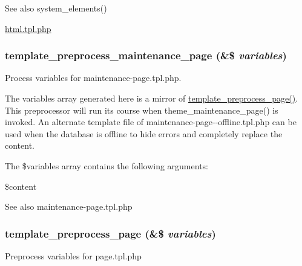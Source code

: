 \begin{DoxySeeAlso}{See also}
system\_\-elements() 

\hyperlink{html_8tpl_8php}{html.tpl.php} 
\end{DoxySeeAlso}
\hypertarget{includes_2theme_8inc_a14a92df5f5e74cebcf7fb680885e58a5}{
\subsubsection[{template\_\-preprocess\_\-maintenance\_\-page}]{\setlength{\rightskip}{0pt plus 5cm}template\_\-preprocess\_\-maintenance\_\-page (\&\$ {\em variables})}}
\label{includes_2theme_8inc_a14a92df5f5e74cebcf7fb680885e58a5}
Process variables for maintenance-\/page.tpl.php.

The variables array generated here is a mirror of \hyperlink{includes_2theme_8inc_a128dae24f990d8ba4710ac78b0584c11}{template\_\-preprocess\_\-page()}. This preprocessor will run its course when theme\_\-maintenance\_\-page() is invoked. An alternate template file of maintenance-\/page-\/-\/offline.tpl.php can be used when the database is offline to hide errors and completely replace the content.

The \$variables array contains the following arguments:
\begin{DoxyItemize}
\item \$content
\end{DoxyItemize}

\begin{DoxySeeAlso}{See also}
maintenance-\/page.tpl.php 
\end{DoxySeeAlso}
\hypertarget{includes_2theme_8inc_a128dae24f990d8ba4710ac78b0584c11}{
\subsubsection[{template\_\-preprocess\_\-page}]{\setlength{\rightskip}{0pt plus 5cm}template\_\-preprocess\_\-page (\&\$ {\em variables})}}
\label{includes_2theme_8inc_a128dae24f990d8ba4710ac78b0584c11}
Preprocess variables for page.tpl.php

